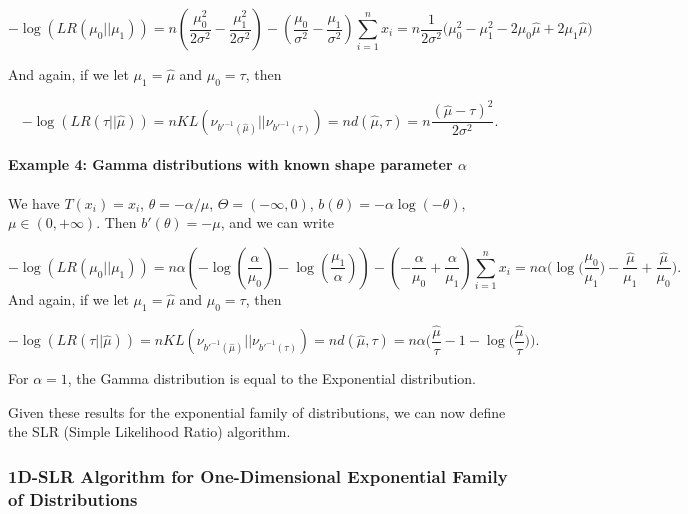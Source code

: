 \documentclass[12pt,]{article}
\let\oldparagraph\paragraph
\renewcommand{\paragraph}[1]{\oldparagraph{#1}\mbox{}}
\begin{document}
\[
-\log(LR(\mu_0||\mu_1)) = n (\frac{\mu_0^2}{2\sigma^2} - \frac{\mu_1^2}{2\sigma^2}) - (\frac{\mu_0}{\sigma^2} - \frac{\mu_1}{\sigma^2})\sum_{i=1}^nx_i = n\frac{1}{2\sigma^2}\Big(\mu_0^2-\mu_1^2 - 2\mu_0\hat{\mu} + 2\mu_1\hat{\mu}\Big)
\]

And again, if we let \(\mu_1 = \hat{\mu}\) and \(\mu_0 = \tau\), then

\[
-\log(LR(\tau||\hat{\mu})) = nKL(\nu_{b'^{-1}(\hat{\mu})}||\nu_{b'^{-1}(\tau)}) = nd(\hat{\mu},\tau) = n\frac{(\hat{\mu} - \tau)^2}{2\sigma^2}.
\]

\paragraph{\texorpdfstring{Example 4: Gamma distributions with known
shape parameter
\(\alpha\)}{Example 4: Gamma distributions with known shape parameter \textbackslash{}alpha}}\label{example-4-gamma-distributions-with-known-shape-parameter-alpha}

We have \(T(x_i) = x_i\), \(\theta = -\alpha/\mu\),
\(\Theta = (-\infty, 0)\), \(b(\theta) = -\alpha \log(-\theta)\),
\(\mu \in (0,+\infty)\). Then \(b'(\theta) = -\mu\), and we can write

\[
-\log(LR(\mu_0||\mu_1)) = n\alpha(-\log(\frac{\alpha}{\mu_0}) - \log(\frac{\mu_1}{\alpha})) - (-\frac{\alpha}{\mu_0} + \frac{\alpha}{\mu_1})\sum_{i=1}^{n}x_i = n\alpha \Big(\log\big(\frac{\mu_0}{\mu_1}\big) - \frac{\hat{\mu}}{\mu_1} + \frac{\hat{\mu}}{\mu_0}\Big).
\] And again, if we let \(\mu_1 = \hat{\mu}\) and \(\mu_0 = \tau\), then

\[
-\log(LR(\tau||\hat{\mu})) = nKL(\nu_{b'^{-1}(\hat{\mu})}||\nu_{b'^{-1}(\tau)}) = nd(\hat{\mu},\tau) = n\alpha \Big(\frac{\hat{\mu}}{\tau} - 1 - \log\big(\frac{\hat{\mu}}{\tau}\big)\Big).
\]

For \(\alpha = 1\), the Gamma distribution is equal to the Exponential
distribution.

Given these results for the exponential family of distributions, we can
now define the SLR (Simple Likelihood Ratio) algorithm.

\subsubsection{1D-SLR Algorithm for One-Dimensional Exponential Family
of
Distributions}\label{d-slr-algorithm-for-one-dimensional-exponential-family-of-distributions}
\end{document}
